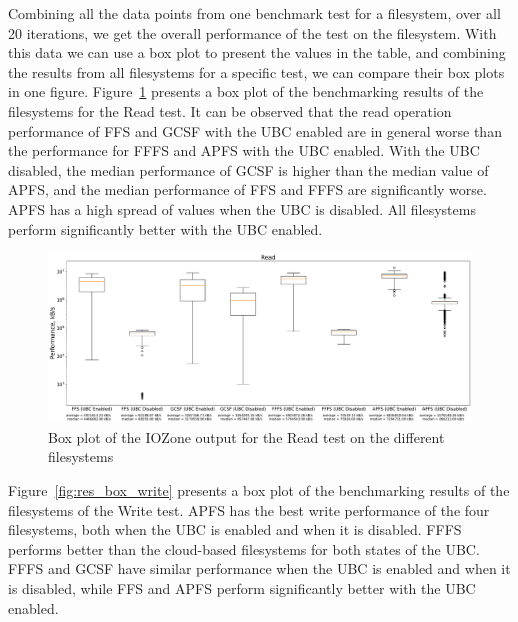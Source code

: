

Combining all the data points from one benchmark test for a filesystem, over all 20 iterations, we get the overall performance of the test on the filesystem. With this data we can use a box plot to present the values in the table, and combining the results from all filesystems for a specific test, we can compare their box plots in one figure. Figure~\ref{fig:res_box_read} presents a box plot of the benchmarking results of the filesystems for the Read test. It can be observed that the read operation performance of \gls{FFS} and \gls{GCSF} with the \gls{UBC} enabled are in general worse than the performance for \gls{FFFS} and \gls{APFS} with the \gls{UBC} enabled. With the \gls{UBC} disabled, the median performance of \gls{GCSF} is higher than the median value of \gls{APFS}, and the median performance of \gls{FFS} and \gls{FFFS} are significantly worse. \gls{APFS} has a high spread of values when the \gls{UBC} is disabled. All filesystems perform significantly better with the \gls{UBC} enabled.

\begin{figure}[!ht]
	\label{fig:res_box_read}
	\begin{center}
		\includegraphics[width=1.0\textwidth]{figures.nosync/benchmarking/Read-boxplot.pdf}
	\end{center}
	\caption{Box plot of the IOZone output for the Read test on the different filesystems}
\end{figure}

\FloatBarrier

Figure~\ref{fig:res_box_write} presents a box plot of the benchmarking results of the filesystems of the Write test. \gls{APFS} has the best write performance of the four filesystems, both when the \gls{UBC} is enabled and when it is disabled. \gls{FFFS} performs better than the \mbox{cloud-based} filesystems for both states of the \gls{UBC}. \gls{FFFS} and \gls{GCSF} have similar performance when the \gls{UBC} is enabled and when it is disabled, while \gls{FFS} and \gls{APFS} perform significantly better with the \gls{UBC} enabled.


